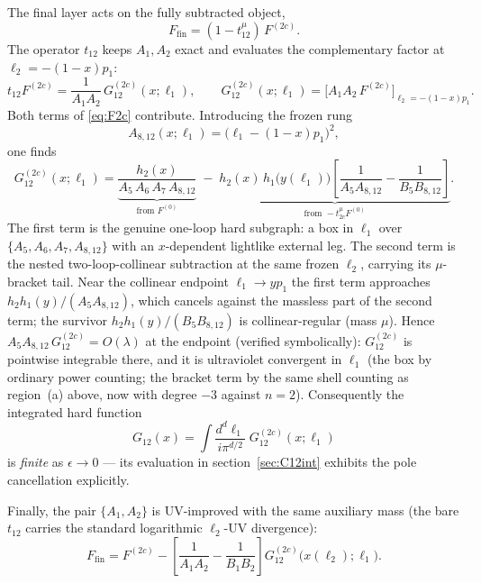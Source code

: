 \documentclass[11pt]{article}
\newcommand{\eps}{\epsilon}
\newcommand{\fin}{\mathrm{fin}}
\begin{document}
The final layer acts on the fully subtracted object,
\begin{equation}
F_{\fin}=(1-t^\mu_{12})\,F^{(2c)} .
\end{equation}
The operator $t_{12}$ keeps $A_1,A_2$ exact and evaluates the complementary factor at
$\ell_2=-(1-x)p_1$:
\begin{equation}
t_{12}F^{(2c)}=\frac{1}{A_1A_2}\,G^{(2c)}_{12}(x;\ell_1),
\qquad
G^{(2c)}_{12}(x;\ell_1)=\Big[A_1A_2\,F^{(2c)}\Big]_{\ell_2=-(1-x)p_1} .
\end{equation}
Both terms of \eqref{eq:F2c} contribute. Introducing the frozen rung
\begin{equation}
A_{8,12}(x;\ell_1)=\big(\ell_1-(1-x)p_1\big)^2 ,
\end{equation}
one finds
\begin{equation}
G^{(2c)}_{12}(x;\ell_1)
=\underbrace{\frac{h_2(x)}{A_5\,A_6\,A_7\,A_{8,12}}}_{\text{from }F^{(0)}}
\;-\;\underbrace{h_2(x)\,h_1\big(y(\ell_1)\big)
\left[\frac{1}{A_5A_{8,12}}-\frac{1}{B_5B_{8,12}}\right]}_{\text{from }-t^\mu_{2c}F^{(0)}} .
\label{eq:G12def}
\end{equation}
The first term is the genuine one-loop hard subgraph: a box in $\ell_1$ over
$\{A_5,A_6,A_7,A_{8,12}\}$ with an $x$-dependent lightlike external leg. The second term is the
nested two-loop-collinear subtraction at the same frozen $\ell_2$, carrying its $\mu$-bracket tail.
Near the collinear endpoint $\ell_1\to y p_1$ the first term approaches
$h_2 h_1(y)/(A_5A_{8,12})$, which cancels against the massless part of the second term; the
survivor $h_2h_1(y)/(B_5B_{8,12})$ is collinear-regular (mass $\mu$). Hence
$A_5A_{8,12}\,G^{(2c)}_{12}=O(\lambda)$ at the endpoint (verified symbolically):
$G^{(2c)}_{12}$ is pointwise integrable there, and it is ultraviolet convergent in $\ell_1$ (the
box by ordinary power counting; the bracket term by the same shell counting as region~(a) above,
now with degree $-3$ against $n=2$). Consequently the integrated hard function
\begin{equation}
G_{12}(x)=\int\frac{d^d\ell_1}{i\pi^{d/2}}\;G^{(2c)}_{12}(x;\ell_1)
\label{eq:G12int}
\end{equation}
is \emph{finite} as $\eps\to0$ --- its evaluation in section~\ref{sec:C12int} exhibits the pole
cancellation explicitly.

Finally, the pair $\{A_1,A_2\}$ is UV-improved with the same auxiliary mass (the bare $t_{12}$
carries the standard logarithmic $\ell_2$-UV divergence):
\begin{equation}
F_{\fin}=F^{(2c)}
-\left[\frac{1}{A_1A_2}-\frac{1}{B_1B_2}\right]G^{(2c)}_{12}\big(x(\ell_2);\ell_1\big) .
\label{eq:Ffin}
\end{equation}
\end{document}
